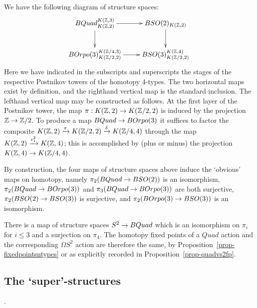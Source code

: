 \documentclass{amsart}
\begin{document}
We have the following diagram of structure spaces:
\begin{equation} \nn
\xymatrix{
BQuad_{K(\ZZ,2)}^{K(\ZZ,3)} \ar[r] \ar[d] & BSO(2)_{K(\ZZ,2)} \ar[d] \\
BOrpo(3)_{K(\ZZ/2,2)}^{K(\ZZ/4,3)} \ar[r] & BSO(3)_{K(\ZZ/2,2)}^{K(\ZZ,4)}
}
\end{equation}
Here we have indicated in the subscripts and superscripts the stages of the respective Postnikov towers of the homotopy 4-types.  The two horizontal maps exist by definition, and the righthand vertical map is the standard inclusion.  The lefthand vertical map may be constructed as follows.  At the first layer of the Postnikov tower, the map $\pi: K(\mathbb Z,2) \rightarrow K(\mathbb Z/2,2)$ is induced by the projection $\mathbb Z \rightarrow \mathbb Z/2$.  To produce a map $BQuad \rightarrow BOrpo(3)$ it suffices to factor the composite $K(\mathbb Z,2) \xrightarrow{\pi} K(\mathbb Z/2,2) \xrightarrow{\delta} K(\mathbb Z/4,4)$ through the map $K(\mathbb Z,2) \xrightarrow{c_1^2} K(\mathbb Z,4)$; this is accomplished by (plus or minus) the projection $K(\mathbb Z,4) \rightarrow K(\mathbb Z/4,4)$.  %

By construction, the four maps of structure spaces above induce the `obvious' maps on homotopy, namely $\pi_2(BQuad \rightarrow BSO(2))$ is an isomorphism, $\pi_2(BQuad \rightarrow BOrpo(3))$ and $\pi_3(BQuad \rightarrow BOrpo(3))$ are both surjective, $\pi_2(BSO(2) \rightarrow BSO(3))$ is surjective, and $\pi_2(BOrpo(3) \rightarrow BSO(3))$ is an isomorphism.  

\begin{remark}
There is a map of structure spaces $S^2 \rightarrow BQuad$ which is an isomorphism on $\pi_i$ for $i \leq 3$ and a surjection on $\pi_4$.  The homotopy fixed points of a $Quad$ action and the corresponding $\Omega S^2$ action are therefore the same, by Proposition~\ref{prop-fixedpointsntypes} or as explicitly recorded in Proposition~\ref{prop-quadvs2fp}.
\end{remark}

\subsection{The `super'-structures}.

\end{document}

